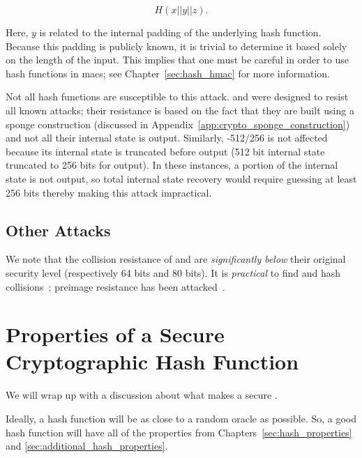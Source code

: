 \begin{equation}
    H(x||y||z).
\end{equation}

\noindent
Here, $y$ is related to the internal padding of the underlying
\gls{hash function}.
Because this padding is publicly known,
it is trivial to determine it based solely on the length of the input.
This implies that one must be careful in order to use
\glspl{hash function} in \glspl{mac};
see Chapter~\ref{sec:hash_hmac} for more information.

Not all \glspl{hash function} are susceptible to this attack.
\Keccak{} and \ShaThree{} were designed to resist all known attacks;
their resistance is based on the fact that they are built
using a sponge construction
(discussed in Appendix~\ref{app:crypto_sponge_construction})
and not all their internal state is output.
Similarly, \ShaTwo{}-512/256 is not affected because its internal state
is truncated before output
(512 bit internal state truncated to 256 bits for output).
In these instances, a portion of the internal state is not output,
so total internal state recovery would require guessing at least 256 bits
thereby making this attack impractical.

\subsection{Other Attacks}

We note that the collision resistance of \MDFive{} and \ShaOne{}
are \emph{significantly below} their original security level
(respectively 64 bits and 80 bits).
It is \emph{practical} to find \MDFive{} and \ShaOne{} hash
collisions~\cite{cryptoeprint:2004:199,cryptoeprint:2005:067,
cryptoeprint:2004:356,cryptoeprint:2020:014,rfc6151,rfc6194};
preimage resistance has been attacked~\cite{MD5FastPreimage2009}.



\section{Properties of a Secure Cryptographic Hash Function}

We will wrap up with a discussion about what makes a secure
.

Ideally, a \gls{hash function} will be as close to a
\gls{random oracle} as possible.
So, a good \gls{hash function} will have all of the properties
from Chapters~\ref{sec:hash_properties} and
\ref{sec:additional_hash_properties}.

